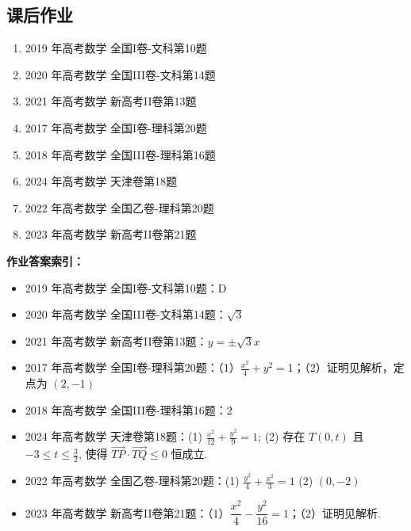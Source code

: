 \documentclass[UTF8,a4paper,11pt]{ctexart}
\begin{document}
\subsection*{课后作业}

\begin{enumerate}

\item 2019 年高考数学 全国I卷-文科第10题

\item 2020 年高考数学 全国III卷-文科第14题

\item 2021 年高考数学 新高考II卷第13题

\item 2017 年高考数学 全国I卷-理科第20题

\item 2018 年高考数学 全国III卷-理科第16题

\item 2024 年高考数学 天津卷第18题

\item 2022 年高考数学 全国乙卷-理科第20题

\item 2023 年高考数学 新高考II卷第21题

\end{enumerate}

\noindent\textbf{作业答案索引：}

\begin{itemize}

\item 2019 年高考数学 全国I卷-文科第10题：D

\item 2020 年高考数学 全国III卷-文科第14题：$\sqrt{3}$

\item 2021 年高考数学 新高考II卷第13题：$y=\pm\sqrt{3}x$

\item 2017 年高考数学 全国I卷-理科第20题：（1）$\frac{x^2}{4}+y^2=1$；（2）证明见解析，定点为 $(2,-1)$

\item 2018 年高考数学 全国III卷-理科第16题：$2$

\item 2024 年高考数学 天津卷第18题：(1) $\frac{x^2}{12}+\frac{y^2}{9}=1$; (2) 存在 $T(0,t)$ 且 $-3\leq t\leq \frac{3}{2}$, 使得 $\overrightarrow{TP}\cdot\overrightarrow{TQ}\leq 0$ 恒成立.

\item 2022 年高考数学 全国乙卷-理科第20题：(1) $\frac{y^2}{4}+\frac{x^2}{3}=1$
(2) $(0,-2)$

\item 2023 年高考数学 新高考II卷第21题：（1）$\dfrac{x^{2}}{4}-\dfrac{y^{2}}{16}=1$；（2）证明见解析.

\end{itemize}
\end{document}
